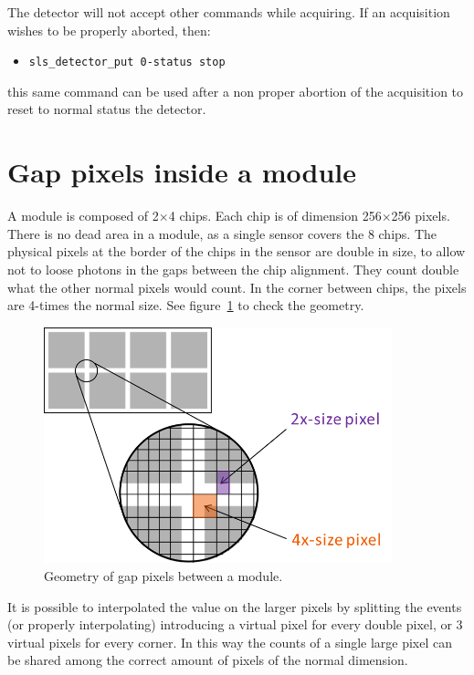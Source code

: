 \documentclass{article}
\begin{document}
The detector will not accept other commands while acquiring. If an acquisition wishes to be properly aborted, then:
\begin{itemize}
\item {\tt{sls\_detector\_put 0-status stop}} 
\end{itemize}
this same command can be used after a non proper abortion of the acquisition to reset to normal status the detector.

\section{Gap pixels inside a module}
A module is composed of 2$\times$4 chips. Each chip is of dimension 256$\times$256 pixels. There is no dead area in a module, as a single sensor covers the 8 chips. The physical pixels at the border of the chips in the sensor are double in size, to allow not to loose photons in the gaps between the chip alignment. They count double what the other normal pixels would count. In the corner between chips, the pixels are 4-times the normal size. See figure~\ref{fgappix} to check the geometry.

\begin{figure}[t]
\begin{center}
\includegraphics[width=0.9\textwidth]{GapPixels}
\end{center}
\caption{Geometry of gap pixels between a module.}
\label{fgappix}
\end{figure}

It is possible to interpolated the value on the larger pixels by splitting the events (or properly interpolating) introducing a virtual pixel for every double pixel, or 3 virtual pixels for every corner. In this way the counts of a single large pixel can be shared among the correct amount of pixels of the normal dimension.     
\end{document}
